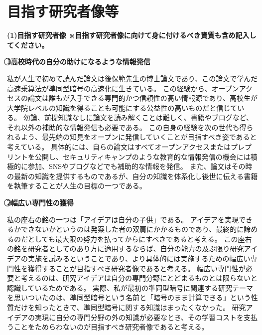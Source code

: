 
\section{目指す研究者像等}

\noindent
\textbf{(1)目指す研究者像 {\footnotesize ※目指す研究者像に向けて身に付けるべき資質も含め記入してください。}}


\noindent\textbf{\textcircled{1}高校時代の自分の助けになるような情報発信}

私が人生で初めて読んだ論文は後保範先生の博士論文であり、この論文で学んだ高速乗算法が準同型暗号の高速化に生きている。
この経験から、オープンアクセスの論文は誰もが入手できる専門的かつ信頼性の高い情報源であり、高校生が大学院レベルの知識を得ることも可能にする公益性の高いものだと信じている。
勿論、前提知識なしに論文を読み解くことは難しく、書籍やブログなど、それ以外の補助的な情報発信も必要である。
この自身の経験を次の世代も得られるよう、最先端の知見をオープンに発信していくことが目指すべき姿であると考えている。
具体的には、自らの論文はすべてオープンアクセスまたはプレプリントを公開し、セキュリティキャンプのような教育的な情報発信の機会には積極的に参加、SNSやブログなどでも補助的な情報を発信。
また、論文はその時の最新の知識を提供するものであるが、自分の知識を体系化し後世に伝える書籍を執筆することが人生の目標の一つである。

\noindent\textbf{\textcircled{2}幅広い専門性の獲得}

私の座右の銘の一つは「アイデアは自分の子供」である。
アイデアを実現できるかできないかというのは発案した者の双肩にかかるものであり、最終的に諦めるのだとしても最大限の努力を払ってからにすべきであると考える。
この座右の銘を研究者としてのあり方に適用するならば、自分の能力の及ぶ限り研究アイデアの実施を試みるということであり、より具体的には実施するための幅広い専門性を獲得することが目指すべき研究者像であると考える。
幅広い専門性が必要と考えるのは、研究アイデアは自分の専門分野にとどまるものとは限らないと認識しているためである。
実際、私が最初の準同型暗号に関連する研究テーマを思いついたのは、準同型暗号という名前と「暗号のまま計算できる」という性質だけを知ったときで、準同型暗号に関する知識はまったくなかった。
研究アイデアの実現に自分の専門分野の外の知識が必要なとき、その学習コストを支払うことをためらわないのが目指すべき研究者像であると考える。

